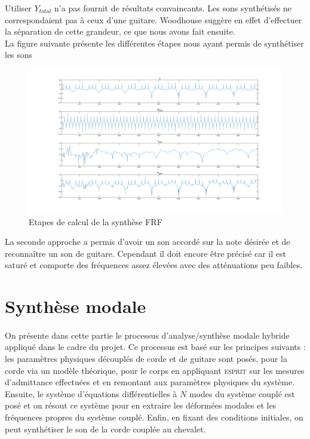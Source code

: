 \documentclass[a4paper,10pt]{article}
\begin{document}
Utiliser $Y_{total}$ n'a pas fournit de résultats convaincants. Les sons
synthétisés ne correspondaient pas à ceux d'une guitare. Woodhouse suggère en
effet d'effectuer la séparation de cette grandeur, ce que nous avons fait
ensuite.\\

La figure suivante présente les différentes étapes nous ayant permis de
synthétiser les sons

\begin{figure}[h]
\centering
\includegraphics[width=\linewidth]{figures/frf_rapport_intermediaire.png}
\caption{Etapes de calcul de la synthèse FRF}
\label{fig:FRF1}
\end{figure}

La seconde approche a permis d'avoir un son accordé sur la note désirée et de
reconnaître un son de guitare. Cependant il doit encore être précisé car il est
saturé et comporte des fréquences assez élevées avec des atténuations peu
faibles.


%
%
%
%


\section{Synthèse modale}

\paragraph{}
  On présente dans cette partie le processus d'analyse/synthèse modale hybride
appliqué dans le cadre du projet. Ce processus est basé sur les principes
suivants : les paramètres physiques découplés de corde et de guitare sont
posés, pour la corde via un modèle théorique, pour le corps en appliquant
\textsc{esprit} sur les mesures d'admittance effectuées et en remontant aux
paramètres physiques du système.
  Ensuite, le système d'équations différentielles à \( N \) modes du système
couplé est posé et on résout ce système pour en extraire les déformées modales
et les fréquences propres du système couplé. Enfin, en fixant des
conditions initiales, on peut synthétiser le son de la corde couplée au
chevalet.
\end{document}
